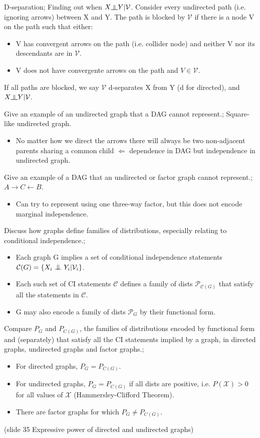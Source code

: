 \documentclass{article}
\newcommand{\indep}{\rotatebox[origin=c]{90}{$\models$}}
\newcommand{\CI}{\mathrel{\text{\scalebox{1.07}{$\perp\mkern-10mu\perp$}}}}
\begin{document}
D-separation; Finding out when $X \indep Y | \mathcal{V}$. Consider every undirected path (i.e. ignoring arrows) between X and Y. The path is blocked by $\mathcal{V}$ if there is a node V on the path such that either: \begin{itemize}
	\item V has convergent arrows on the path (i.e. collider node) and neither V nor its descendants are in $\mathcal{V}$.
	\item V does not have convergente arrows on the path and $V\in\mathcal{V}$.
\end{itemize}
If all paths are blocked, we say $\mathcal{V}$ d-separates X from Y (d for directed), and $X \indep Y | \mathcal{V}$.

Give an example of an undirected graph that a DAG cannot represent.; Square-like undirected graph. \begin{itemize}
	\item No matter how we direct the arrows there will always be two non-adjacent parents sharing a common child $\Leftarrow$ dependence in DAG but independence in undirected graph.
\end{itemize}

Give an example of a DAG that an undirected or factor graph cannot represent.; $A \rightarrow C \leftarrow B$. \begin{itemize}
	\item Can try to represent using one three-way factor, but this does not encode marginal independence.	
\end{itemize}

Discuss how graphs define families of distributions, especially relating to conditional independence.; \begin{itemize}
    \item Each graph G implies a set of conditional independence statements $\mathcal{C}(G)=\{X_i\CI Y_i|\mathcal{V}_i\}$.
    \item Each such set of CI statements $\mathcal{C}$ defines a family of dists $\mathcal{P}_{\mathcal{C}(G)}$ that satisfy all the statements in $\mathcal{C}$. 
    \item G may also encode a family of dists $\mathcal{P}_{G}$ by their functional form.
\end{itemize}

Compare $P_G$ and $P_{C(G)}$, the families of distributions encoded by functional form and (separately) that satisfy all the CI statements implied by a graph, in directed graphs, undirected graphs and factor graphs.;
\begin{itemize}
    \item For directed graphs, $P_G = P_{C(G)}$.
    \item For undirected graphs, $P_G = P_{C(G)}$ if all dists are positive, i.e. $P(\mathcal{X})>0$ for all values of $\mathcal{X}$ (Hammersley-Clifford Theorem).
    \item There are factor graphs for which $P_G \ne P_{C(G)}$.
\end{itemize}
(slide 35 Expressive power of directed and undirected graphs)
\end{document}

